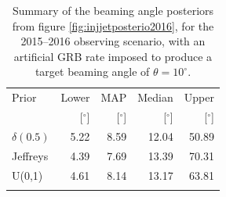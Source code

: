 \documentclass[twocolumn]{aastex61}
\begin{document}
\begin{table}
  \centering
  \begin{tabular}{lrrrr}
    \toprule
    Prior & Lower & MAP & Median & Upper\\
          & [$^\circ$] & [$^\circ$]& [$^\circ$]& [$^\circ$] \\
    \colrule
    $\delta(0.5)$ & 5.22	 & 8.59	 & 12.04	 & 50.89	 \\
    Jeffreys & 4.39	 & 7.69	 & 13.39	 & 70.31	 \\
    U(0,1) & 4.61	 & 8.14	 & 13.17	 & 63.81	 \\
    \botrule
\end{tabular}
\caption{Summary of the beaming angle posteriors from figure
  \ref{fig:injjetposterio2016}, for the 2015--2016 observing scenario,
  with an artificial GRB rate imposed to produce a target beaming
  angle of $\theta = 10^{\circ}$.
  \label{tab:summaryinj2015}}
\end{table}

%
\end{document}
